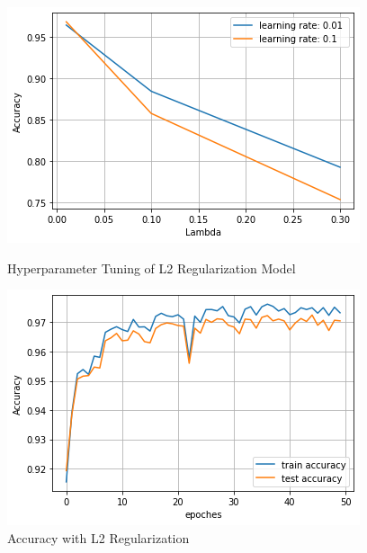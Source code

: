 \documentclass[11pt]{homework}
\begin{document}
\begin{figure}[h!]
  \centering
  \begin{minipage}[h]{0.4\textwidth}
    \includegraphics[width=\textwidth]{hyper-l2-reg.png}
     \caption{Hyperparameter Tuning of L2 Regularization Model}
     \label{exp-3-tuning}
  \end{minipage}
\hspace{1.5cm}
  \begin{minipage}[h]{0.4\textwidth}
    \includegraphics[width=\textwidth]{acc-l2-reg.png}
    \caption{Accuracy with L2 Regularization}
    \label{exp-3-accuracy}
  \end{minipage}
\end{figure}
\end{document}
